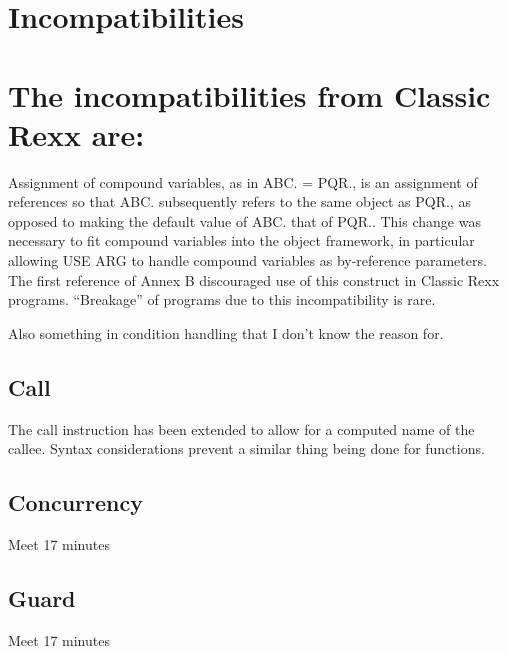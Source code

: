 \hypertarget{incompatibilities}{%
\chapter{Incompatibilities}\label{incompatibilities}}

\hypertarget{the-incompatibilities-from-classic-rexx-are}{%
\chapter{The incompatibilities from Classic Rexx
are:}\label{the-incompatibilities-from-classic-rexx-are}}

Assignment of compound variables, as in ABC. = PQR., is an assignment of
references so that ABC. subsequently refers to the same object as PQR.,
as opposed to making the default value of ABC. that of PQR.. This change
was necessary to fit compound variables into the object framework, in
particular allowing USE ARG to handle compound variables as by-reference
parameters. The first reference of Annex B discouraged use of this
construct in Classic Rexx programs. ``Breakage'' of programs due to this
incompatibility is rare.

Also something in condition handling that I don't know the reason for.

\hypertarget{call}{%
\section{Call}\label{call}}

The call instruction has been extended to allow for a computed name of
the callee. Syntax considerations prevent a similar thing being done for
functions.

\hypertarget{concurrency}{%
\section{Concurrency}\label{concurrency}}

Meet 17 minutes

\hypertarget{guard}{%
\section{Guard}\label{guard}}

Meet 17 minutes
